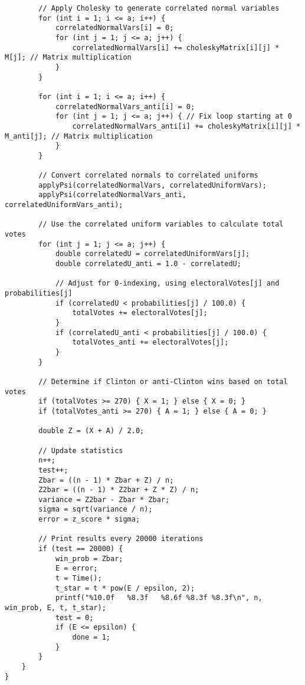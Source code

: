 \documentclass{report}
\begin{document}
\begin{lstlisting}
        // Apply Cholesky to generate correlated normal variables
        for (int i = 1; i <= a; i++) {
            correlatedNormalVars[i] = 0;
            for (int j = 1; j <= a; j++) {
                correlatedNormalVars[i] += choleskyMatrix[i][j] * M[j]; // Matrix multiplication
            }
        }

        for (int i = 1; i <= a; i++) {
            correlatedNormalVars_anti[i] = 0;
            for (int j = 1; j <= a; j++) { // Fix loop starting at 0
                correlatedNormalVars_anti[i] += choleskyMatrix[i][j] * M_anti[j]; // Matrix multiplication
            }
        }

        // Convert correlated normals to correlated uniforms
        applyPsi(correlatedNormalVars, correlatedUniformVars);
        applyPsi(correlatedNormalVars_anti, correlatedUniformVars_anti);

        // Use the correlated uniform variables to calculate total votes
        for (int j = 1; j <= a; j++) {
            double correlatedU = correlatedUniformVars[j];
            double correlatedU_anti = 1.0 - correlatedU;

            // Adjust for 0-indexing, using electoralVotes[j] and probabilities[j]
            if (correlatedU < probabilities[j] / 100.0) {
                totalVotes += electoralVotes[j];
            }
            if (correlatedU_anti < probabilities[j] / 100.0) {
                totalVotes_anti += electoralVotes[j];
            }
        }

        // Determine if Clinton or anti-Clinton wins based on total votes
        if (totalVotes >= 270) { X = 1; } else { X = 0; }
        if (totalVotes_anti >= 270) { A = 1; } else { A = 0; }

        double Z = (X + A) / 2.0;

        // Update statistics
        n++;
        test++;
        Zbar = ((n - 1) * Zbar + Z) / n;
        Z2bar = ((n - 1) * Z2bar + Z * Z) / n;
        variance = Z2bar - Zbar * Zbar;
        sigma = sqrt(variance / n);
        error = z_score * sigma;

        // Print results every 20000 iterations
        if (test == 20000) {
            win_prob = Zbar;
            E = error;
            t = Time();
            t_star = t * pow(E / epsilon, 2);
            printf("%10.0f   %8.3f   %8.6f %8.3f %8.3f\n", n, win_prob, E, t, t_star);
            test = 0;
            if (E <= epsilon) {
                done = 1;
            }
        }
    }
}





\end{lstlisting}
\end{document}

